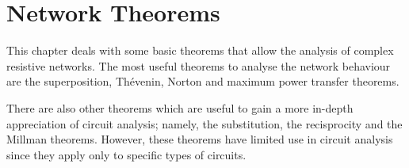 \chapter{Network Theorems}

\begin{summary}
  This chapter deals with some basic theorems that allow the analysis of complex resistive networks. The most useful theorems to analyse the network behaviour are the superposition, Thévenin, Norton and maximum power transfer theorems.
  
  There are also other theorems which are useful to gain a more in-depth appreciation of circuit analysis; namely, the substitution, the recisprocity and the Millman theorems. However, these theorems have limited use in circuit analysis since they apply only to specific types of circuits.
\end{summary}

